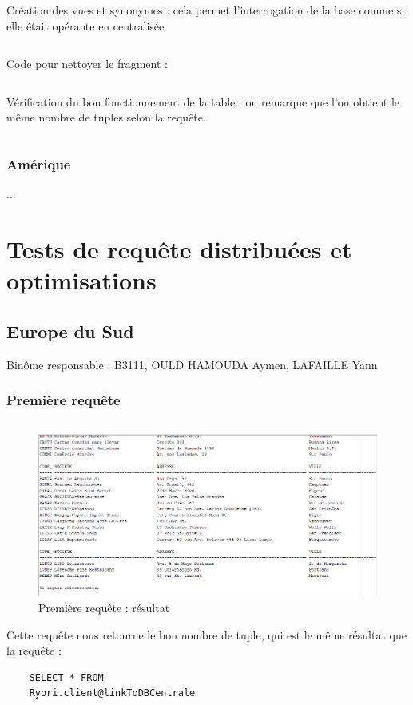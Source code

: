 \documentclass[10pt,a4paper]{article}
\theoremstyle{plain}
\begin{document}
Création des vues et synonymes : cela permet l'interrogation de la base comme si elle était opérante en centralisée

\inputminted{sql}{EUS_III-C-7.sql}
\newpage

Code pour nettoyer le fragment :
\inputminted{sql}{EUS_III-C-8.sql}
\newpage

Vérification du bon fonctionnement de la table : on remarque que l'on obtient le même nombre de tuples selon la requête.
\inputminted{sql}{EUS_III-C-9.sql}
\newpage 

\subsubsection{Amérique}
...
\newpage

\section{Tests de requête distribuées et optimisations}
\subsection{Europe du Sud}
Binôme responsable : B3111, OULD HAMOUDA Aymen, LAFAILLE Yann

\subsubsection{Première requête}
\inputminted{sql}{EUS_IV-A-1.sql}
\begin{figure}[!h]
    \centering
    \includegraphics[width=15cm]{EUS_req1.PNG}
    \caption{Première requête : résultat}
\end{figure}
Cette requête nous retourne le bon nombre de tuple, qui est le même résultat que la requête :
\begin{verbatim}
    SELECT * FROM
    Ryori.client@linkToDBCentrale
\end{verbatim}
\end{document}
